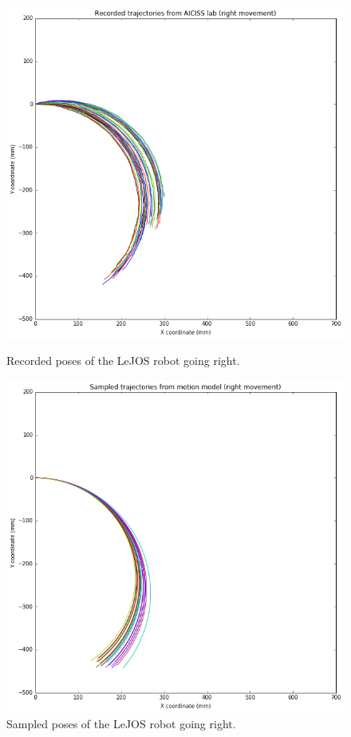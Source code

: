 \documentclass[paper=a4, fontsize=11pt]{scrartcl} %
\begin{document}
    \begin{figure}[h!]
    	\centering
    	\begin{minipage}{0.45\textwidth}
    		\centering
    		\includegraphics[width=1\textwidth]{images/recorded_poses_right.png} %
    		\caption{Recorded poses of the LeJOS robot going right.}
    	\end{minipage}\hfill
    	\begin{minipage}{0.45\textwidth}
    		\centering
    		\includegraphics[width=1\textwidth]{images/sampled_poses_right.png} %
    		\caption{Sampled poses of the LeJOS robot going right.}
    	\end{minipage}
    \end{figure}
  
\end{document}
